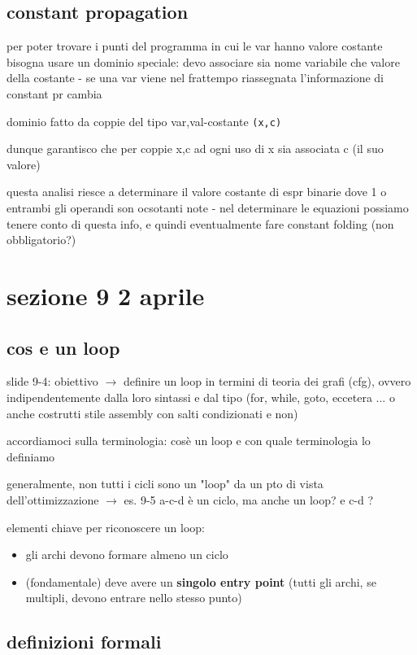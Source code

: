 \subsection{constant propagation}

per poter trovare i punti del programma in cui le var hanno valore costante bisogna usare un dominio speciale: devo associare sia nome variabile che valore della costante - se una var viene nel frattempo riassegnata l'informazione di constant pr cambia

dominio fatto da coppie del tipo var,val-costante \lstinline|(x,c)|

dunque garantisco che per coppie x,c ad ogni uso di x sia associata c (il suo valore)

questa analisi riesce a determinare il valore costante di espr binarie dove 1 o entrambi gli operandi son ocsotanti note - nel determinare le equazioni possiamo tenere conto di questa info, e quindi eventualmente fare constant folding (non obbligatorio?)

\section{sezione 9 2 aprile}

\subsection{cos e un loop}

slide 9-4: obiettivo $\rightarrow$ definire un loop in termini di teoria dei grafi (cfg), ovvero indipendentemente dalla loro sintassi e dal tipo (for, while, goto, eccetera ... o anche costrutti stile assembly con salti condizionati e non)

accordiamoci sulla terminologia: cos\`e un loop e con quale terminologia lo definiamo

generalmente, non tutti i cicli sono un "loop" da un pto di vista dell'ottimizzazione $\rightarrow$ es. 9-5 a-c-d \`e un ciclo, ma anche un loop? e c-d ?

elementi chiave per riconoscere un loop:
\begin{itemize}
  \item gli archi devono formare almeno un ciclo
  \item (fondamentale) deve avere un \textbf{singolo entry point} (tutti gli archi, se multipli, devono entrare nello stesso punto)
\end{itemize}

\subsection{definizioni formali}

